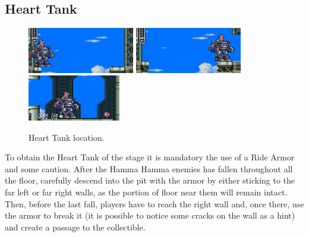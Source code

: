 \subsection{Heart Tank}
\begin{figure}[htp]
	\centering
	\includegraphics[height=2cm]{figures/X3/Crush_crawfish/heart_1.jpg}
	\includegraphics[height=2cm]{figures/X3/Crush_crawfish/heart_2.jpg}\vspace{2pt}\\
	\includegraphics[height=2cm]{figures/X3/Crush_crawfish/heart_3.jpg}
	\caption{Heart Tank location.}
\end{figure}
To obtain the Heart Tank of the stage it is mandatory the use of a Ride Armor and some caution. After the Hamma Hamma enemies has fallen throughout all the floor, carefully descend into the pit with the armor by either sticking to the far left or far right walls, as the portion of floor near them will remain intact. Then,  before the last fall, players have to reach the right wall and, once there, use the armor to break it (it is possible to notice some cracks on the wall as a hint) and create a passage to the collectible.


